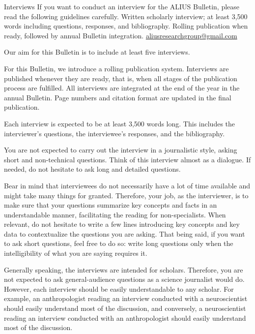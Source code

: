 \documentclass[11pt]{article}
\begin{document}
\guideHeader
  {Interviews}
  {If you want to conduct an interview for the ALIUS Bulletin, please read the following guidelines carefully.}
  {Written scholarly interview; at least 3,500 words including questions, responses, and bibliography.}
  {Rolling publication when ready, followed by annual Bulletin integration.}
  {\href{mailto:aliusresearchgroup@gmail.com}{aliusresearchgroup@gmail.com}}

Our aim for this Bulletin is to include at least five interviews.


For this Bulletin, we introduce a rolling publication system. Interviews are published whenever they are ready, that is, when all stages of the publication process are fulfilled. All interviews are integrated at the end of the year in the annual Bulletin. Page numbers and citation format are updated in the final publication.


Each interview is expected to be at least 3,500 words long. This includes the interviewer's questions, the interviewee's responses, and the bibliography.


You are not expected to carry out the interview in a journalistic style, asking short and non-technical questions. Think of this interview almost as a dialogue. If needed, do not hesitate to ask long and detailed questions.

Bear in mind that interviewees do not necessarily have a lot of time available and might take many things for granted. Therefore, your job, as the interviewer, is to make sure that your questions summarize key concepts and facts in an understandable manner, facilitating the reading for non-specialists. When relevant, do not hesitate to write a few lines introducing key concepts and key data to contextualize the questions you are asking. That being said, if you want to ask short questions, feel free to do so: write long questions only when the intelligibility of what you are saying requires it.

Generally speaking, the interviews are intended for scholars. Therefore, you are not expected to ask general-audience questions as a science journalist would do. However, each interview should be easily understandable to any scholar. For example, an anthropologist reading an interview conducted with a neuroscientist should easily understand most of the discussion, and conversely, a neuroscientist reading an interview conducted with an anthropologist should easily understand most of the discussion.
\end{document}
